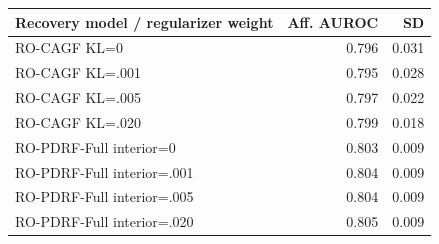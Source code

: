 \begin{tabular}{lrr}
\toprule
Recovery model / regularizer weight & Aff. AUROC & SD \\
\midrule
RO-CAGF KL=0 & 0.796 & 0.031 \\
RO-CAGF KL=.001 & 0.795 & 0.028 \\
RO-CAGF KL=.005 & 0.797 & 0.022 \\
RO-CAGF KL=.020 & 0.799 & 0.018 \\
RO-PDRF-Full interior=0 & 0.803 & 0.009 \\
RO-PDRF-Full interior=.001 & 0.804 & 0.009 \\
RO-PDRF-Full interior=.005 & 0.804 & 0.009 \\
RO-PDRF-Full interior=.020 & 0.805 & 0.009 \\
\bottomrule
\end{tabular}